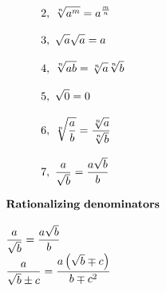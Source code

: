 \documentclass{article}
\begin{document}
\begin{multicols}{3}
\[\begin{array}{>{\displaystyle}l}
        2,\ \sqrt[n]{a^{m}} =a^{\frac{m}{n}}\\
        \\
        3,\ \sqrt{a}\sqrt{a} =a\\
        \\
        4,\ \sqrt[n]{ab} =\sqrt[n]{a}\sqrt[n]{b}\\
        \\
        5,\ \sqrt{0} =0\\
        \\
        6,\ \sqrt[n]{\frac{a}{b}} =\frac{\sqrt[n]{a}}{\sqrt[n]{b}}\\
        \\
        7,\ \frac{a}{\sqrt{b}} =\frac{a\sqrt{b}}{b}
    \end{array}
    \]
\end{multicols}

\[
\begin{array}{>{\displaystyle}l}
\mathbf{Rationalizing\ denominators}\\
\\
\frac{a}{\sqrt{b}} =\frac{a\sqrt{b}}{b}\\
\frac{a}{\sqrt{b} \pm c} =\frac{a\left(\sqrt{b} \mp c\right)}{b\mp c^{2}}
\end{array}    
\]

\newpage
\end{document}
